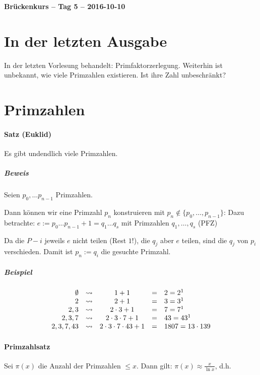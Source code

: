 \documentclass[14pt,a4paper]{article}
\begin{document}
	\begin{center}
		\Huge\textbf{Brückenkurs – Tag 5 – 2016-10-10}
	\end{center}
	\par

  \section*{In der letzten Ausgabe}
  In der letzten Vorlesung behandelt: Primfaktorzerlegung.
  Weiterhin ist unbekannt, wie viele Primzahlen existieren. Ist ihre Zahl
  unbeschränkt?

  \setcounter{section}{5}
  \section{Primzahlen}
  \paragraph{Satz (Euklid)}
  Es gibt undendlich viele Primzahlen.

  \subparagraph{Beweis}
  Seien $ p_0, \dots p_{n-1} $ Primzahlen.

  Dann können wir eine Primzahl $p_n$
  konstruieren mit $p_n \notin \{p_0, \dots, p_{n-1}\}$:
  Dazu betrachte: $ e := p_0 \dots p_{n-1} + 1 = q_1 \dots q_s $ mit
  Primzahlen $ q_1, \dots, q_s$ (PFZ)


  Da die $P-i$ jeweils $e$ nicht teilen (Rest $1$!), die $q_j$ aber $e$ teilen,
  sind die $q_j$ von $p_i$ verschieden.
  Damit ist $p_n := q_i$ die gesuchte Primzahl.

  \subparagraph{Beispiel}
  $$
  \begin{array}{r c c c l}
    \emptyset & \rightsquigarrow & 1 + 1 & = & 2 = 2^1  \\
  {2} & \rightsquigarrow & 2 + 1 & = & 3 = 3^1 \\
  {2,3} & \rightsquigarrow & 2 \cdot 3 + 1 & = & 7 = 7^1 \\
  {2,3,7} & \rightsquigarrow & 2 \cdot 3 \cdot 7 + 1 & = & 43 = 43^1 \\
  {2, 3,7,43} & \rightsquigarrow & 2 \cdot 3 \cdot 7 \cdot 43 + 1 & = & 1807 = 13 \cdot
    139 \\
  \end{array}
  $$

  \paragraph{Primzahlsatz}
  Sei $\pi(x)$ die Anzahl der Primzahlen $ \le x$.
  Dann gilt: $\pi(x) \approx \frac{x}{\ln x}$, d.h.
\end{document}
